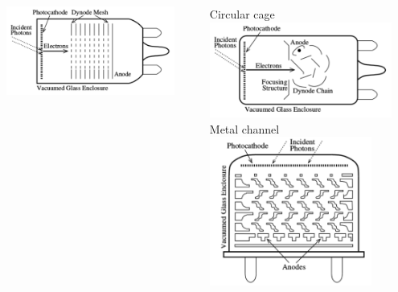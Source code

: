 \documentclass{beamer}
\begin{document}
\begin{frame}
\begin{columns}
\begin{column}{0.3\textwidth}
\begin{center}
\includegraphics[height=0.3\textheight,width=0.9\textwidth]{d1/mesh_type_pmt}
\end{center}
\end{column}
\begin{column}{0.3\textwidth}
\begin{center}
{\color{blue}Circular cage}
\includegraphics[height=0.3\textheight,width=0.9\textwidth]{d1/circular_cage_pmt} \\ 
{\color{blue}Metal channel}
\includegraphics[height=0.3\textheight,width=0.8\textwidth]{d1/metal_channel_pmt}
\end{center}
\end{column}
\end{columns}
\end{frame}
\end{document}
